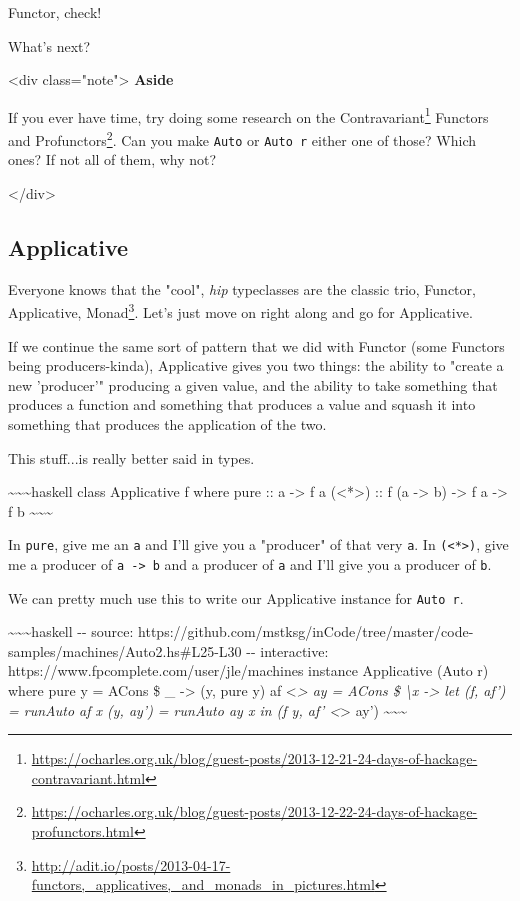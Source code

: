\documentclass[]{article}
\renewcommand{\href}[2]{#2\footnote{\url{#1}}}
\begin{document}
Functor, check!

What's next?

\textless{}div class="note"\textgreater{} \textbf{Aside}

If you ever have time, try doing some research on the
\href{https://ocharles.org.uk/blog/guest-posts/2013-12-21-24-days-of-hackage-contravariant.html}{Contravariant}
Functors and
\href{https://ocharles.org.uk/blog/guest-posts/2013-12-22-24-days-of-hackage-profunctors.html}{Profunctors}.
Can you make \texttt{Auto} or \texttt{Auto\ r} either one of those? Which ones?
If not all of them, why not?

\textless{}/div\textgreater{}

\subsection{Applicative}

Everyone knows that the "cool", \emph{hip} typeclasses are the classic trio,
\href{http://adit.io/posts/2013-04-17-functors,_applicatives,_and_monads_in_pictures.html}{Functor,
Applicative, Monad}. Let's just move on right along and go for Applicative.

If we continue the same sort of pattern that we did with Functor (some Functors
being producers-kinda), Applicative gives you two things: the ability to "create
a new 'producer'" producing a given value, and the ability to take something
that produces a function and something that produces a value and squash it into
something that produces the application of the two.

This stuff...is really better said in types.

\textasciitilde{}\textasciitilde{}\textasciitilde{}haskell class Applicative f
where pure :: a -\textgreater{} f a (\textless{}*\textgreater{}) :: f (a
-\textgreater{} b) -\textgreater{} f a -\textgreater{} f b
\textasciitilde{}\textasciitilde{}\textasciitilde{}

In \texttt{pure}, give me an \texttt{a} and I'll give you a "producer" of that
very \texttt{a}. In \texttt{(\textless{}*\textgreater{})}, give me a producer of
\texttt{a\ -\textgreater{}\ b} and a producer of \texttt{a} and I'll give you a
producer of \texttt{b}.

We can pretty much use this to write our Applicative instance for
\texttt{Auto\ r}.

\textasciitilde{}\textasciitilde{}\textasciitilde{}haskell -\/- source:
https://github.com/mstksg/inCode/tree/master/code-samples/machines/Auto2.hs\#L25-L30
-\/- interactive: https://www.fpcomplete.com/user/jle/machines instance
Applicative (Auto r) where pure y = ACons \$ \_ -\textgreater{} (y, pure y) af
\textless{}\emph{\textgreater{} ay = ACons \$ \textbackslash{}x -\textgreater{}
let (f, af') = runAuto af x (y, ay') = runAuto ay x in (f y, af'
\textless{}}\textgreater{} ay')
\textasciitilde{}\textasciitilde{}\textasciitilde{}
\end{document}
